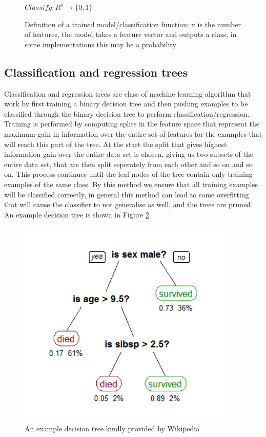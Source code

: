 \documentclass[ %
                    author={Sam Phippen},
                supervisor={Dr. Rafal Bogacz},
                     title={Real time voice activity detectors in noisy personal computing environments},
                  subtitle={},
                    degree={MEng},
                      year={2012} ]{thesis}
\begin{document}
\begin{figure}
    $Classify: R^x \rightarrow \{0,1\}$
    \caption{Definition of a trained model/classification function: x is the
        number of features, the model takes a feature vector and outputs a class,
    in some implementations this may be a probability}
    \label{eqn:define-classify}
\end{figure}

\subsection{Classification and regression trees}

Classification and regression trees are class of machine learning algorithm
that work by first training a binary decision tree and then pushing examples to
be classified through the binary decision tree to perform
classification/regression. Training is performed by computing splits in the
feature space that represent the maximum gain in information over the entire
set of features for the examples that will reach this part of the tree. At the
start the split that gives highest information gain over the entire data set is
chosen, giving us two subsets of the entire data set, that are then split
seperately from each other and so on and so on. This process continues until
the leaf nodes of the tree contain only training examples of the same class. By
this method we ensure that all training examples will be classified correctly,
in general this method can lead to some overfitting that will cause the classifier
to not generalise as well, and the trees are pruned. An example decision tree
is shown in Figure \ref{fig:decision-tree}.

\begin{figure}

    \includegraphics[height=10cm]{decision_tree.png}

    \label{fig:decision-tree}
    \caption{An example decision tree kindly provided by Wikipedia}
\end{figure}
\end{document}
